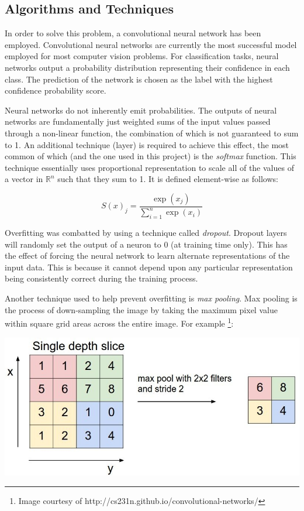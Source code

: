 \documentclass[12pt]{article}
\begin{document}
\subsection{Algorithms and Techniques} \label{sssec:algs}
In order to solve this problem, a convolutional neural network has been employed.
Convolutional neural networks are currently the most successful model employed for most computer vision problems.
For classification tasks, neural networks output a probability distribution representing their confidence in each class.
The prediction of the network is chosen as the label with the highest confidence probability score.

Neural networks do not inherently emit probabilities.
The outputs of neural networks are fundamentally just weighted sums of the input values passed through a non-linear function, the combination of which is not guaranteed to sum to 1.
An additional technique (layer) is required to achieve this effect, the most common of which (and the one used in this project) is the \textit{softmax} function.
This technique essentially uses proportional representation to scale all of the values of a vector in $\mathbb{R}^n$ such that they sum to 1.
It is defined element-wise as follows:

\begin{equation}
	S(x)_j = \frac{\exp(x_j)}{\sum_{i=1}^{n} \exp(x_i)}
\end{equation}

Overfitting was combatted by using a technique called \textit{dropout}\cite{svhn_dropout}.
Dropout layers will randomly set the output of a neuron to 0 (at training time only).
This has the effect of forcing the neural network to learn alternate representations of the input data.
This is because it cannot depend upon any particular representation being consistently correct during the training process.

Another technique used to help prevent overfitting is \textit{max pooling}.
Max pooling is the process of down-sampling the image by taking the maximum pixel value within square grid areas across the entire image.
For example \footnote{Image courtesy of http://cs231n.github.io/convolutional-networks/}:

\hfill \break
\begin{centering}
	\includegraphics[width=0.85\columnwidth]{images/maxpool.jpg}
	\label{Testing}
\end{centering}
\hfill \break
\end{document}
